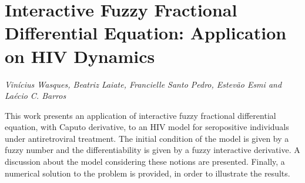 \documentclass[../booklet.tex]{subfiles}
\begin{document}
\section[Interactive Fuzzy Fractional Differential Equation: Application on HIV Dynamics. {\it Vinícius Wasques, Beatriz Laiate, Francielle Santo Pedro, Estevão Esmi and Laécio C. Barros}]{Interactive Fuzzy Fractional Differential Equation: Application on HIV Dynamics}
    

\begin{center}
  {\it Vinícius Wasques, Beatriz Laiate, Francielle Santo Pedro, Estevão Esmi and Laécio C. Barros}
\end{center}

\vskip 0.8cm



This work presents an application of interactive fuzzy fractional differential equation, with Caputo derivative, to an HIV model for seropositive individuals under antiretroviral treatment. The initial condition of the model is given by a fuzzy number and the differentiability is given by a fuzzy interactive derivative. A discussion about the model considering these notions are presented. Finally, a numerical solution to the problem is provided, in order to illustrate the results.

\end{document}

